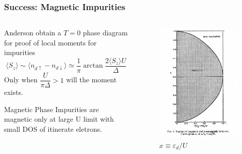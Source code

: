\documentclass[10pt,aspectratio=43,xcolor=x11names]{beamer}%
\begin{document}
		\begin{frame}[t]\frametitle{Success: Magnetic Impurities}
			\begin{columns}
				\begin{column}{0.4\textwidth}
					Anderson obtain a $T=0$ phase diagram for proof of local moments for impurities
					\begin{equation*}
						\langle S_z \rangle \sim \langle n_{d\uparrow}-n_{d\downarrow} \rangle\simeq\dfrac{1}{\pi}\arctan\dfrac{2\langle S_z \rangle U}{\Delta}
					\end{equation*}
					Only when $\dfrac{U}{\pi\Delta}>1$ will the moment exists.
					\pause
					\begin{redblock}{Magnetic Phase}
						Impurities are magnetic only {\color{blue}at large U limit} with small DOS of itinerate eletrons.
					\end{redblock}
				\end{column}
				\begin{column}{0.4\textwidth}
					\begin{figure}[!htp]
						\centering
						\includegraphics[scale=0.5]{phase.pdf}
						\caption{$x\equiv \varepsilon_d/U$}
					\end{figure}
				\end{column}
			\end{columns}
		\end{frame}
\end{document}
